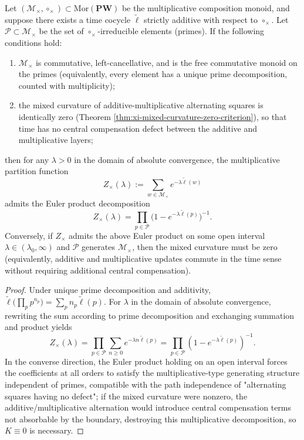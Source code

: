 \begin{theorem}\label{thm:xi-time-euler-product-under-zero-mixed-curvature}
Let \((\mathcal M_\times,\circ_\times)\subset \mathrm{Mor}(\mathbf{PW})\) be the multiplicative composition monoid, and suppose there exists a time cocycle \(\widetilde{\ell}\) strictly additive with respect to \(\circ_\times\).
Let \(\mathcal P\subset\mathcal M_\times\) be the set of \(\circ_\times\)-irreducible elements (primes).
If the following conditions hold:
\begin{enumerate}
  \item \(\mathcal M_\times\) is commutative, left-cancellative, and is the free commutative monoid on the primes (equivalently, every element has a unique prime decomposition, counted with multiplicity);
  \item the mixed curvature of additive-multiplicative alternating squares is identically zero (Theorem \ref{thm:xi-mixed-curvature-zero-criterion}), so that time has no central compensation defect between the additive and multiplicative layers;
\end{enumerate}
then for any \(\lambda>0\) in the domain of absolute convergence, the multiplicative partition function
\[
Z_\times(\lambda):=\sum_{w\in\mathcal M_\times}e^{-\lambda \widetilde{\ell}(w)}
\]
admits the Euler product decomposition
\[
Z_\times(\lambda)=\prod_{p\in\mathcal P}\bigl(1-e^{-\lambda \widetilde{\ell}(p)}\bigr)^{-1}.
\]
Conversely, if \(Z_\times\) admits the above Euler product on some open interval \(\lambda\in(\lambda_0,\infty)\) and \(\mathcal P\) generates \(\mathcal M_\times\), then the mixed curvature must be zero (equivalently, additive and multiplicative updates commute in the time sense without requiring additional central compensation).
\end{theorem}

\begin{proof}
Under unique prime decomposition and additivity,
\(
\widetilde{\ell}\bigl(\prod_p p^{n_p}\bigr)=\sum_p n_p\widetilde{\ell}(p)
\).
For \(\lambda\) in the domain of absolute convergence, rewriting the sum according to prime decomposition and exchanging summation and product yields
\[
Z_\times(\lambda)
=\prod_{p\in\mathcal P}\sum_{n\ge 0}e^{-\lambda n\widetilde{\ell}(p)}
=\prod_{p\in\mathcal P}(1-e^{-\lambda\widetilde{\ell}(p)})^{-1}.
\]
In the converse direction, the Euler product holding on an open interval forces the coefficients at all orders to satisfy the multiplicative-type generating structure independent of primes, compatible with the path independence of "alternating squares having no defect"; if the mixed curvature were nonzero, the additive/multiplicative alternation would introduce central compensation terms not absorbable by the boundary, destroying this multiplicative decomposition, so \(K\equiv 0\) is necessary.
\end{proof}


